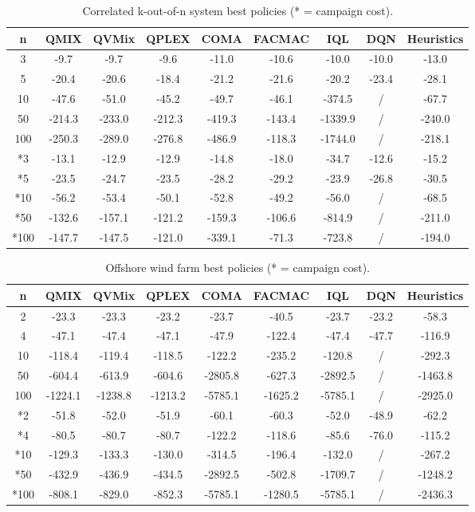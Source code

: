 \begin{table}
\centering
\setlength\tabcolsep{4.5pt}
\begin{tabular}{c|ccccccc|c}
\toprule
n & QMIX & QVMix & QPLEX & COMA & FACMAC & IQL & DQN & Heuristics \\
\midrule
3 & -9.7 & -9.7 & -9.6 & -11.0 & -10.6 & -10.0 & -10.0 & -13.0 \\
5 & -20.4 & -20.6 & -18.4 & -21.2 & -21.6 & -20.2 & -23.4 & -28.1 \\
10 & -47.6 & -51.0 & -45.2 & -49.7 & -46.1 & -374.5 & / & -67.7 \\
50 & -214.3 & -233.0 & -212.3 & -419.3 & -143.4 & -1339.9 & / & -240.0 \\
100 & -250.3 & -289.0 & -276.8 & -486.9 & -118.3 & -1744.0 & / & -218.1 \\
\midrule
*3 & -13.1 & -12.9 & -12.9 & -14.8 & -18.0 & -34.7 & -12.6 & -15.2 \\
*5 & -23.5 & -24.7 & -23.5 & -28.2 & -29.2 & -23.9 & -26.8 & -30.5 \\
*10 & -56.2 & -53.4 & -50.1 & -52.8 & -49.2 & -56.0 & / & -68.5 \\
*50 & -132.6 & -157.1 & -121.2 & -159.3 & -106.6 & -814.9 & / & -211.0 \\
*100 & -147.7 & -147.5 & -121.0 & -339.1 & -71.3 & -723.8 & / & -194.0 \\
\bottomrule
\end{tabular}
\caption{Correlated k-out-of-n system best policies (* = campaign cost).}
\label{tab:correlatedkoutofnresults}
\end{table}

\begin{table}
\centering
\setlength\tabcolsep{4.5pt}
\begin{tabular}{c|ccccccc|c}
\toprule
n & QMIX & QVMix & QPLEX & COMA & FACMAC & IQL & DQN & Heuristics \\
\midrule
2 & -23.3 & -23.3 & -23.2 & -23.7 & -40.5 & -23.7 & -23.2 & -58.3 \\
4 & -47.1 & -47.4 & -47.1 & -47.9 & -122.4 & -47.4 & -47.7 & -116.9 \\
10 & -118.4 & -119.4 & -118.5 & -122.2 & -235.2 & -120.8 & / & -292.3 \\
50 & -604.4 & -613.9 & -604.6 & -2805.8 & -627.3 & -2892.5 & / & -1463.8 \\
100 & -1224.1 & -1238.8 & -1213.2 & -5785.1 & -1625.2 & -5785.1 & / & -2925.0 \\
\midrule
*2 & -51.8 & -52.0 & -51.9 & -60.1 & -60.3 & -52.0 & -48.9 & -62.2 \\
*4 & -80.5 & -80.7 & -80.7 & -122.2 & -118.6 & -85.6 & -76.0 & -115.2 \\
*10 & -129.3 & -133.3 & -130.0 & -314.5 & -196.4 & -132.0 & / & -267.2 \\
*50 & -432.9 & -436.9 & -434.5 & -2892.5 & -502.8 & -1709.7 & / & -1248.2 \\
*100 & -808.1 & -829.0 & -852.3 & -5785.1 & -1280.5 & -5785.1 & / & -2436.3 \\
\bottomrule
\end{tabular}
\caption{Offshore wind farm best policies (* = campaign cost).}
\label{tab:owfresults}
\end{table}


